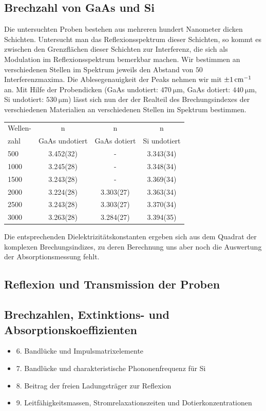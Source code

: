 \documentclass[paper=a4,fontsize=10pt,DIV=18,twocolumn,parskip=half]{scrartcl}
\numberwithin{equation}{section}    %
\begin{document}
\subsection{Brechzahl von GaAs und Si}
Die untersuchten Proben bestehen aus mehreren hundert Nanometer dicken Schichten.
Untersucht man das Reflexionsspektrum dieser Schichten, so kommt es zwischen den Grenzflächen dieser Schichten zur Interferenz, die sich als Modulation im Reflexionsspektrum bemerkbar machen. 
Wir bestimmen an verschiedenen Stellen im Spektrum jeweils den Abstand von $50$ Interferenzmaxima. Die Ablesegenauigkeit der Peaks nehmen wir mit $\SI{\pm 1}{\centi\meter^{-1}}$ an.
Mit Hilfe der Probendicken (GaAs undotiert: $\SI{470}{\micro\meter}$, GaAs dotiert: $\SI{440}{\micro\meter}$, Si undotiert: $\SI{530}{\micro\meter}$) lässt sich nun der der Realteil des Brechungsindexes der verschiedenen Materialien an verschiedenen Stellen im Spektrum bestimmen.

\begin{tabular}{ l | c c c }
  Wellen- & n & n&n\\
  zahl & GaAs undotiert & GaAs dotiert & Si undotiert \\
  \hline
  500 & 3.452(32) & - & 3.343(34) \\
  1000 & 3.245(28) & - & 3.348(34) \\
  1500 & 3.243(28) & - & 3.369(34) \\
  2000 & 3.224(28) & 3.303(27) & 3.363(34) \\
  2500 & 3.243(28) & 3.303(27) & 3.370(34) \\
  3000 & 3.263(28) & 3.284(27) & 3.394(35) \\
\end{tabular}

Die entsprechenden Dielektrizitätskonstanten ergeben sich aus dem Quadrat der komplexen Brechungsindizes, 
zu deren Berechnung uns aber noch die Auswertung der Absorptionsmessung fehlt.

\subsection{Reflexion und Transmission der Proben}

\subsection{Brechzahlen, Extinktions- und Absorptionskoeffizienten}

\begin{itemize}
\item 6. Bandlücke und Impulsmatrixelemente
\item 7. Bandlücke und charakteristische Phononenfrequenz für Si
\item 8. Beitrag der freien Ladungsträger zur Reflexion
\item 9. Leitfähigkeitsmassen, Stromrelaxationszeiten und Dotierkonzentrationen
\end{itemize}
\end{document}
